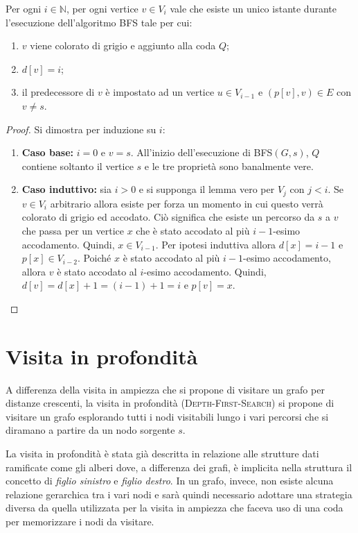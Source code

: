 \begin{lemmabox}
	Per ogni $i \in \mathbb{N}$, per ogni vertice $v \in V_{i}$ vale che esiste un unico istante durante l'esecuzione dell'algoritmo \textsc{BFS} tale per cui:
	\begin{enumerate}
		\item $v$ viene colorato di grigio e aggiunto alla coda $Q$;
		\item $d[v] = i$;
		\item il predecessore di $v$ è impostato ad un vertice $u \in V_{i-1}$ e $(p[v],v) \in E$ con $v \neq s$.
	\end{enumerate}
\end{lemmabox}
\begin{proof}
	Si dimostra per induzione su $i$:
\begin{enumerate}
	\item \textbf{Caso base:} $i=0$ e $v=s$. All'inizio dell'esecuzione di \textsc{BFS}$(G,s)$, $Q$ contiene soltanto il vertice $s$ e le tre proprietà sono banalmente vere.
	\item \textbf{Caso induttivo:} sia $i>0$ e si supponga il lemma vero per $V_{j}$ con $j<i$. Se $v \in V_{i}$ arbitrario allora esiste per forza un momento in cui questo verrà colorato di grigio ed accodato. Ciò significa che esiste un percorso da $s$ a $v$ che passa per un vertice $x$ che è stato accodato al più $i-1$-esimo accodamento. Quindi, $x \in V_{i-1}$. Per ipotesi induttiva allora $d[x] = i-1$ e $p[x] \in V_{i-2}$. Poiché $x$ è stato accodato al più $i-1$-esimo accodamento, allora $v$ è stato accodato al $i$-esimo accodamento. Quindi, $d[v] = d[x]+1 = (i-1)+1 = i$ e $p[v] = x$.
\end{enumerate}
\end{proof}

\section{Visita in profondità}
A differenza della visita in ampiezza che si propone di visitare un grafo per distanze crescenti, la visita in profondità (\textsc{Depth-First-Search}) si propone di visitare un grafo esplorando tutti i nodi visitabili lungo i vari percorsi che si diramano a partire da un nodo sorgente $s$.

La visita in profondità è stata già descritta in relazione alle strutture dati ramificate come gli alberi dove, a differenza dei grafi, è implicita nella struttura il concetto di \textit{figlio sinistro} e \textit{figlio destro}. In un grafo, invece, non esiste alcuna relazione gerarchica tra i vari nodi e sarà quindi necessario adottare una strategia diversa da quella utilizzata per la visita in ampiezza che faceva uso di una coda per memorizzare i nodi da visitare.

